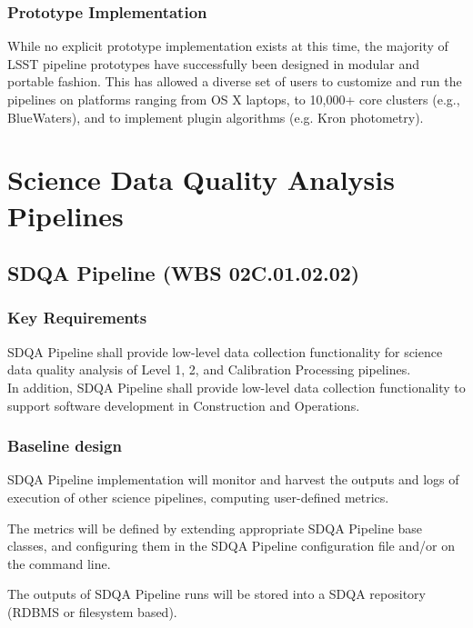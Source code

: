 \documentclass[12pt]{article}
\newcommand{\wbsSDQAP}{WBS 02C.01.02.02}
\begin{document}
\subsubsection{Prototype Implementation}

While no explicit prototype implementation exists at this time, the majority of LSST pipeline prototypes have successfully been designed in modular and portable fashion. This has allowed a diverse set of users to customize and run the pipelines on platforms ranging from OS X laptops, to 10,000+ core clusters (e.g., BlueWaters), and to implement plugin algorithms (e.g. Kron photometry).

\clearpage

\section{Science Data Quality Analysis Pipelines}

\subsection{SDQA Pipeline (\wbsSDQAP)}

\subsubsection{Key Requirements}

SDQA Pipeline shall provide low-level data collection functionality for science data quality analysis of Level 1, 2, and Calibration Processing pipelines.
\\

In addition, SDQA Pipeline shall provide low-level data collection functionality to support software development in Construction and Operations.

\subsubsection{Baseline design}

SDQA Pipeline implementation will monitor and harvest the outputs and logs of execution of other science pipelines, computing user-defined metrics.

The metrics will be defined by extending appropriate SDQA Pipeline base classes, and configuring them in the SDQA Pipeline configuration file and/or on the command line.

The outputs of SDQA Pipeline runs will be stored into a SDQA repository (RDBMS or filesystem based).
\end{document}
